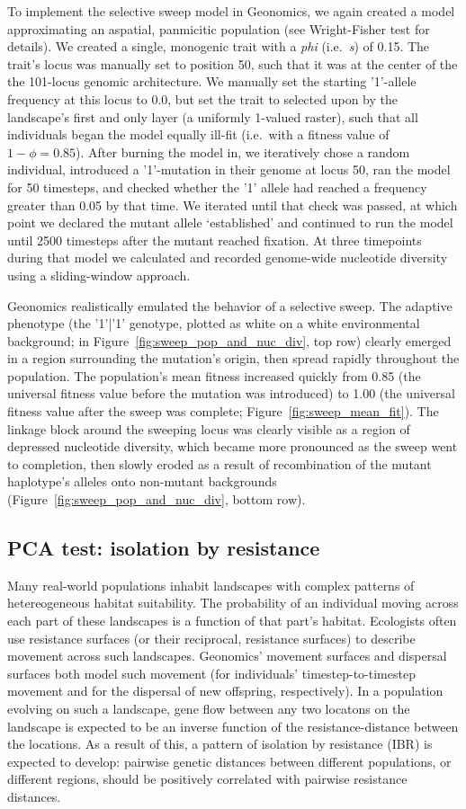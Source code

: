 ﻿\documentclass{article}
\begin{document}
To implement the selective sweep model in Geonomics, we again created a model
approximating an aspatial, panmicitic population (see Wright-Fisher test for details).
We created a single, monogenic trait with a \emph{phi} (i.e.\ \emph{s}) of 0.15.
The trait's locus was manually set to position 50,
such that it was at the center of the the 101-locus genomic architecture.
We manually set the starting '1'-allele frequency at this locus to 0.0,
but set the trait to selected upon by the landscape's first and only layer
(a uniformly 1-valued raster), such that all individuals began the model
equally ill-fit (i.e.\ with a fitness value of $1 - \phi = 0.85$).
After burning the model in, we iteratively chose a random individual,
introduced a '1'-mutation in their genome at locus 50, ran the model for 50 timesteps,
and checked whether the '1' allele had reached a frequency greater than 0.05 by that time.
We iterated until that check was passed, at which point we declared the mutant allele
`established' and continued to run the model until 2500 timesteps
after the mutant reached fixation.
At three timepoints during that model we calculated and recorded
genome-wide nucleotide diversity using a sliding-window approach.

Geonomics realistically emulated the behavior of a selective sweep.
The adaptive phenotype (the '1'|'1' genotype, plotted as white
on a white environmental background; in Figure~\ref{fig:sweep_pop_and_nuc_div}, top row)
clearly emerged in a region surrounding the mutation's origin,
then spread rapidly throughout the population.
The population's mean fitness increased quickly from 0.85
(the universal fitness value before the mutation was introduced) to 1.00
(the universal fitness value after the sweep was complete;
Figure~\ref{fig:sweep_mean_fit}).
The linkage block around the sweeping locus was clearly visible
as a region of depressed nucleotide diversity, which became more pronounced
as the sweep went to completion, then slowly eroded as a result of recombination
of the mutant haplotype's alleles onto non-mutant backgrounds
(Figure~\ref{fig:sweep_pop_and_nuc_div}, bottom row).


\subsection{PCA test: isolation by resistance}
Many real-world populations inhabit landscapes with complex patterns
of hetereogeneous habitat suitability.
The probability of an individual moving across each part of these landscapes
is a function of that part's habitat.
Ecologists often use resistance surfaces (or their reciprocal, resistance surfaces)
to describe movement across such landscapes.
Geonomics' movement surfaces and dispersal surfaces both model such movement
(for individuals' timestep-to-timestep movement and for the dispersal of new
offspring, respectively).
In a population evolving on such a landscape, gene flow between any two locatons on the
landscape is expected to be an inverse function of the resistance-distance between the locations.
As a result of this, a pattern of isolation by resistance (IBR) is expected to develop:
pairwise genetic distances between different populations, or different regions, should be
positively correlated with pairwise resistance distances.
\end{document}
